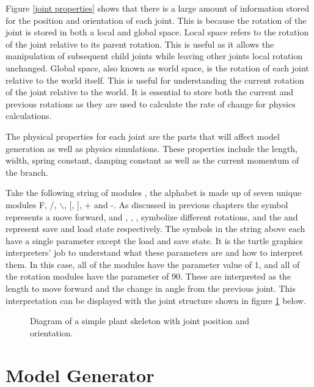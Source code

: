 \noindent
Figure \ref{joint properties} shows that there is a large amount of information stored for the position and orientation of each joint. This is because the rotation of the joint is stored in both a local and global space. Local space refers to the rotation of the joint relative to its parent rotation. This is useful as it allows the manipulation of subsequent child joints while leaving other joints local rotation unchanged. Global space, also known as world space, is the rotation of each joint relative to the world itself. This is useful for understanding the current rotation of the joint relative to the world. It is essential to store both the current and previous rotations as they are used to calculate the rate of change for physics calculations.

The physical properties for each joint are the parts that will affect model generation as well as physics simulations. These properties include the length, width, spring constant, damping constant as well as the current momentum of the branch. 

Take the following string of modules , the alphabet is made up of seven unique modules F, /, $\backslash$, [, ], + and -. As discussed in previous chapters the  symbol represents a move forward, and \say{+}, \say{-}, \say{/}, \say{$\backslash$} symbolize different rotations, and the \say{[} and \say{]} represent save and load state respectively. The symbols in the string above each have a single parameter except the load and save state. It is the turtle graphics interpreters' job to understand what these parameters are and how to interpret them. In this case, all of the  modules have the parameter value of 1, and all of the rotation modules have the parameter of 90. These are interpreted as the length to move forward and the change in angle from the previous joint. This interpretation can be displayed with the joint structure shown in figure \ref{skeleton diagram} below.

\begin{figure}[htbp]
	{\centering
		\vspace{7px}
		\setlength{\fboxrule}{1pt}
		\caption{Diagram of a simple plant skeleton with joint position and orientation.} \label{skeleton diagram}
	}
\end{figure}
\FloatBarrier

\section{Model Generator}


